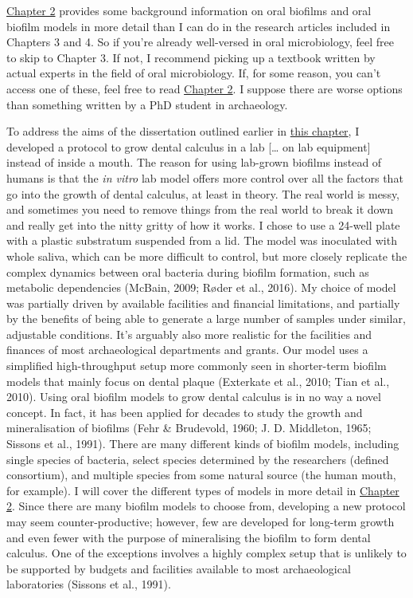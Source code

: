 \documentclass[
  letterpaper,
]{book}
\begin{document}
\protect\hyperlink{chap-background}{Chapter 2} provides some background
information on oral biofilms and oral biofilm models in more detail than
I can do in the research articles included in Chapters 3 and 4. So if
you're already well-versed in oral microbiology, feel free to skip to
Chapter 3. If not, I recommend picking up a textbook written by actual
experts in the field of oral microbiology. If, for some reason, you
can't access one of these, feel free to read
\protect\hyperlink{chap-background}{Chapter 2}. I suppose there are
worse options than something written by a PhD student in archaeology.

To address the aims of the dissertation outlined earlier in
\protect\hyperlink{intro-aims}{this chapter}, I developed a protocol to
grow dental calculus in a lab {[}\ldots{} on lab equipment{]} instead of
inside a mouth. The reason for using lab-grown biofilms instead of
humans is that the \emph{in vitro} lab model offers more control over
all the factors that go into the growth of dental calculus, at least in
theory. The real world is messy, and sometimes you need to remove things
from the real world to break it down and really get into the nitty
gritty of how it works. I chose to use a 24-well plate with a plastic
substratum suspended from a lid. The model was inoculated with whole
saliva, which can be more difficult to control, but more closely
replicate the complex dynamics between oral bacteria during biofilm
formation, such as metabolic dependencies (McBain, 2009; Røder et al.,
2016). My choice of model was partially driven by available facilities
and financial limitations, and partially by the benefits of being able
to generate a large number of samples under similar, adjustable
conditions. It's arguably also more realistic for the facilities and
finances of most archaeological departments and grants. Our model uses a
simplified high-throughput setup more commonly seen in shorter-term
biofilm models that mainly focus on dental plaque (Exterkate et al.,
2010; Tian et al., 2010). Using oral biofilm models to grow dental
calculus is in no way a novel concept. In fact, it has been applied for
decades to study the growth and mineralisation of biofilms (Fehr \&
Brudevold, 1960; J. D. Middleton, 1965; Sissons et al., 1991). There are
many different kinds of biofilm models, including single species of
bacteria, select species determined by the researchers (defined
consortium), and multiple species from some natural source (the human
mouth, for example). I will cover the different types of models in more
detail in \protect\hyperlink{background}{Chapter 2}. Since there are
many biofilm models to choose from, developing a new protocol may seem
counter-productive; however, few are developed for long-term growth and
even fewer with the purpose of mineralising the biofilm to form dental
calculus. One of the exceptions involves a highly complex setup that is
unlikely to be supported by budgets and facilities available to most
archaeological laboratories (Sissons et al., 1991).
\end{document}
